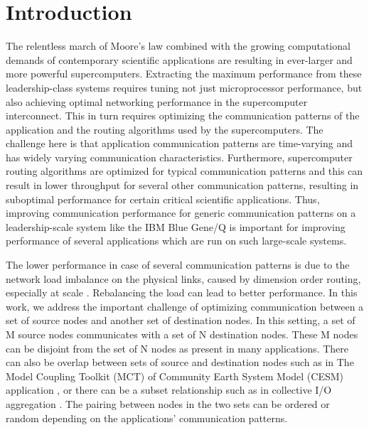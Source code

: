 \section{Introduction}
\label{sec:intro}

The relentless march of Moore's law combined with the growing computational demands of contemporary scientific applications are resulting in ever-larger and more powerful supercomputers. Extracting the maximum performance from these leadership-class systems requires tuning not just microprocessor performance, but also achieving optimal networking performance in the supercomputer interconnect. This in turn requires optimizing the communication patterns of the application and the routing algorithms used by the supercomputers. The challenge here is that application communication patterns are time-varying and has widely varying communication characteristics. Furthermore, supercomputer routing algorithms are optimized for typical communication patterns \cite{Chen:BGQ} and this can result in lower throughput for several other communication patterns, resulting in suboptimal performance for certain critical scientific applications. Thus, improving communication performance for generic communication patterns on a leadership-scale system like the IBM Blue Gene/Q is important for improving performance of several applications which are run on such large-scale systems. 

The lower performance in case of several communication patterns is due to the network load imbalance on the physical links, caused by dimension order routing, especially at scale \cite{npc14}. Rebalancing the load can lead to better performance.  
In this work, we address the important challenge of optimizing communication between a set of source nodes and another set of destination nodes. In this setting, a set of M source nodes communicates with a set of N destination nodes. These M nodes can be disjoint from the set of N nodes as present in many applications. There can also be overlap between sets of source and destination nodes such as in The Model Coupling Toolkit (MCT) of Community Earth System Model (CESM) application \cite{MCT:Jacob}, or there can be a subset relationship such as in collective I/O aggregation \cite{Vishwanath:GLEAN}. The pairing between nodes in the two sets can be ordered or random depending on the applications' communication patterns.

